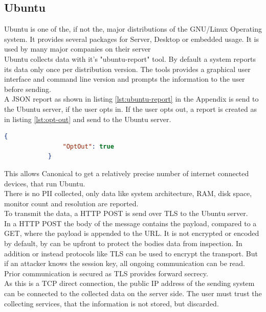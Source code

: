     \subsection{Ubuntu}
        Ubuntu is one of the, if not the, major distributions of the GNU/Linux Operating system. It provides several packages for Server, Desktop or embedded usage. It is used by many major companies on their server\cite{canonical_enterprise_nodate}\\
        Ubuntu collects data with it's "ubuntu-report" tool. By default a system reports its data only once per distribution version. The tools provides a graphical user interface and command line version and prompts the information to the user before sending\cite{roche_ubuntuubuntu-report_2020}.\\
        A JSON report as shown in listing \ref{lst:ubuntu-report} in the Appendix is send to the Ubuntu server, if the user opts in. If the user opts out, a report is created as in listing \ref{lst:opt-out} and send to the Ubuntu server\cite{roche_ubuntuubuntu-report_2020}.\\ 
        \begin{lstlisting}[language=json, caption=JSON report on opt out, label=lst:opt-out]
            {
                "OptOut": true
            }
        \end{lstlisting}
        This allows Canonical to get a relatively precise number of internet connected devices, that run Ubuntu.\\
        There is no PII collected, only data like system architecture, RAM, disk space, monitor count and resolution are reported.\\
        To transmit the data, a HTTP POST is send over TLS to the Ubuntu server.\\
        
        In a HTTP POST the body of the message contains the payload, compared to a GET, where the payload is appended to the URL.
        It is not encrypted or encoded by default, by can be upfront to protect the bodies data from inspection. In addition or instead protocols like TLS can be used to encrypt the transport. But if an attacker knows the session key, all ongoing communication can be read. Prior communication is secured as TLS provides forward secrecy.\\
        
        As this is a TCP direct connection, the public IP address of the sending system can be connected to the collected data on the server side.
        The user must trust the collecting services, that the information is not stored, but discarded.\\
        
